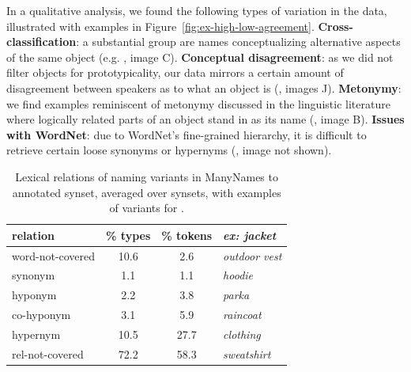 
In a qualitative analysis, we found the following types of variation in the data, illustrated with examples in Figure~\ref{fig:ex-high-low-agreement}.
\textbf{Cross-classification}: a substantial group are names conceptualizing alternative aspects of the same object (e.g. , image C).
\textbf{Conceptual disagreement}: as we did not filter objects for prototypicality, our data mirrors a certain amount of disagreement between speakers as to what an object is (, images J).
\textbf{Metonymy}: we find examples reminiscent of metonymy discussed in the linguistic literature \cite{pustejovsky1991generative} where logically related parts of an object stand in as its name (, image B). 
\textbf{Issues with WordNet}: due to WordNet's fine-grained hierarchy, it is difficult to retrieve certain loose synonyms or hypernyms (, image not shown).
%
\begin{table}[t]
\centering
\setlength{\tabcolsep}{2pt}
\begin{tabular}{lcc|p{2.5cm}}
\toprule
         relation & \% types & \% tokens & \it ex: jacket \\
\midrule
 word-not-covered &  10.6 &  2.6 & \it outdoor vest\\
\midrule
 synonym &  1.1 &  1.1 & \it hoodie  \\
 hyponym &  2.2 &  3.8 & \it parka\\ %
 co-hyponym &  3.1 &  5.9 & \it raincoat\\
 hypernym &  10.5 &  27.7 & \it clothing \\%
 rel-not-covered &  72.2 &  58.3 & \it sweatshirt\\%
\bottomrule
\end{tabular}
\caption{Lexical relations of naming variants in ManyNames to annotated \vg synset, averaged over synsets, with examples of variants for .}
\label{tab:rel}
\vspace{-0.5cm}
\end{table}


